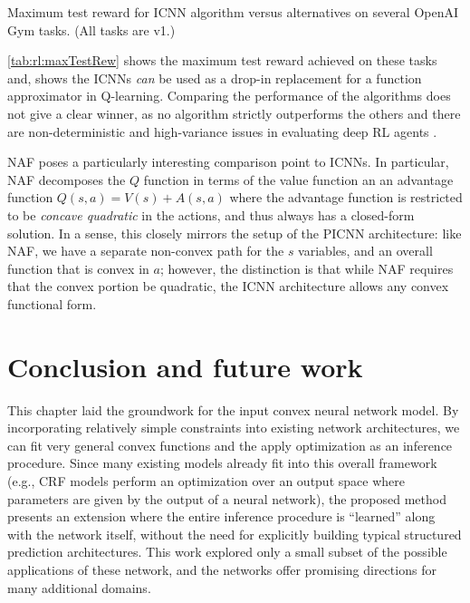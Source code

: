 \begin{table}
\begin{center}

\caption{Maximum test reward for ICNN algorithm versus alternatives on several
OpenAI Gym tasks. (All tasks are v1.)}
\label{tab:rl:maxTestRew}
\end{center}
\end{table}

\cref{tab:rl:maxTestRew} shows the maximum test reward achieved
on these tasks and, shows the ICNNs \emph{can} be used as a
drop-in replacement for a function approximator in Q-learning.
Comparing the performance of the algorithms does not give
a clear winner, as no algorithm strictly outperforms the others
and there are non-deterministic and high-variance issues
in evaluating deep RL agents \citep{henderson2018deep}.

NAF poses a particularly interesting comparison point to ICNNs.
In particular, NAF decomposes the $Q$ function in terms of the
value function an an advantage function
$Q(s,a) = V(s) + A(s,a)$ where the advantage function is restricted to
be \emph{concave quadratic} in the actions, and thus always has a closed-form
solution.  In a sense, this closely mirrors the setup of the PICNN architecture:
like NAF, we have a separate non-convex path for the $s$ variables, and an
overall function that is convex in $a$; however, the distinction is that while
NAF requires that the convex portion be quadratic, the ICNN
architecture allows any convex functional form.

\section{Conclusion and future work}
This chapter laid the groundwork for the input convex neural network model.  By
incorporating relatively simple constraints into existing network architectures,
we can fit very general convex functions and the apply optimization as an
inference procedure.  Since many existing models already fit into this overall
framework (e.g., CRF models perform an optimization over an output space where
parameters are given by the output of a neural network), the proposed method
presents an extension where the entire inference procedure is ``learned'' along
with the network itself, without the need for explicitly building typical
structured prediction architectures.  This work explored only a small subset of
the possible applications of these network, and the networks offer promising
directions for many additional domains.

